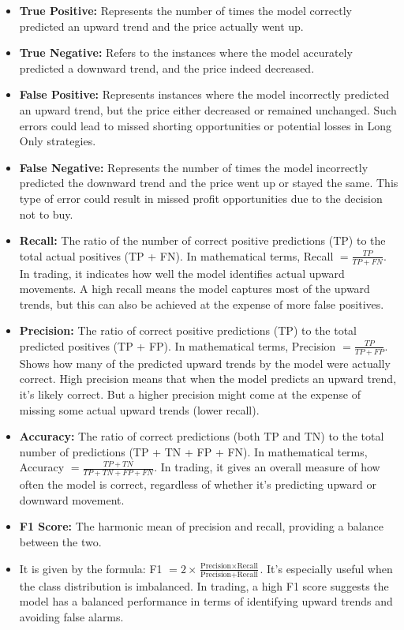 \begin{itemize}
	\item \textbf{True Positive:} Represents the number of times the model correctly predicted an upward trend and the price actually went up.

	\item \textbf{True Negative:} Refers to the instances where the model accurately predicted a downward trend, and the price indeed decreased.

	\item \textbf{False Positive:} Represents instances where the model incorrectly predicted an upward trend, but the price either decreased or remained unchanged.
                                    Such errors could lead to missed shorting opportunities or potential losses in Long Only strategies.

	\item \textbf{False Negative:} Represents the number of times the model incorrectly predicted the downward trend and the price went up or stayed the same. This type of error could result in missed profit opportunities due to the decision not to buy.

	\item \textbf{Recall:} The ratio of the number of correct positive predictions (TP) to the total actual positives (TP + FN). In mathematical terms, Recall $= \frac{TP}{TP + FN}$. In trading, it indicates how well the model identifies actual upward movements. A high recall means the model captures most of the upward trends, but this can also be achieved at the expense of more false positives.

	\item \textbf{Precision:} The ratio of correct positive predictions (TP) to the total predicted positives (TP + FP). In mathematical terms, Precision $= \frac{TP}{TP + FP}$. Shows how many of the predicted upward trends by the model were actually correct. High precision means that when the model predicts an upward trend, it's likely correct. But a higher precision might come at the expense of missing some actual upward trends (lower recall).

	\item \textbf{Accuracy:} The ratio of correct predictions (both TP and TN) to the total number of predictions (TP + TN + FP + FN). In mathematical terms, Accuracy $= \frac{TP + TN}{TP + TN + FP + FN}$. In trading, it gives an overall measure of how often the model is correct, regardless of whether it's predicting upward or downward movement.

	\item \textbf{F1 Score:} The harmonic mean of precision and recall, providing a balance between the two.
    \item It is given by the formula: F1 $= 2 \times \frac{\text{Precision} \times \text{Recall}}{\text{Precision} + \text{Recall}}$. It's especially useful when the class distribution is imbalanced. In trading, a high F1 score suggests the model has a balanced performance in terms of identifying upward trends and avoiding false alarms.
\end{itemize}



